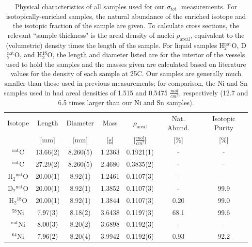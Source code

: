 \documentclass[twocolumn,secnumarabic,amssymb, nobibnotes, aps, prl,
superscriptaddress, nobalancelastpage]{revtex4}
\newcommand{\tots}{\ensuremath{\sigma_{tot}}\,\,}
\begin{document}
\begin{table}[ht]
    \caption{
        Physical characteristics of all samples used for our \tots
        measurements. For isotopically-enriched samples, the natural abundance
        of the enriched isotope and the isotopic fraction of the sample are
        given. To calculate cross sections, the relevant ``sample thickness" is the areal
        density of nuclei $\rho_{\text{areal}}$, equivalent to
        the (volumetric) density times the length of the sample. For liquid
        samples H$_{2}^{\text{nat}}$O, D$_{2}^{\text{nat}}$O, and H$_{2}^{18}$O,
        the length and diameter listed are for the interior of the vessels
        used to hold the samples and the masses given are calculated based on 
        literature values for the density of each sample at 25\textdegree{}C.
        Our samples are generally much smaller than those used in previous
        measurements; for comparison, the Ni and Sn samples used in \cite{Abfalterer2001,
        Finlay1993} had areal densities of 1.515 and 0.5475
        $\frac{mol}{cm^{2}}$, respectively (12.7 and 6.5 times larger than our
    Ni and Sn samples).}
    \label{SampleTable}
    \begin{center}
        \begin{tabular}{ c c c c c c c }
            \hline
            Isotope & Length & Diameter
            & Mass & $\rho_{\text{areal}}$ & Nat. Abund. & Isotopic Purity\\
                 & [mm] & [mm] & [g] & [$\frac{mol}{cm^{2}}$] & [\%] & [\%]\\
            \hline

            $^{\text{nat}}$C & 13.66(2) & 8.260(5) & 1.2363
            & 0.1921(1) & - & -\\
            $^{\text{nat}}$C & 27.29(2) & 8.260(5) & 2.4680
            & 0.3835(2) & - & -\\

            H$_{2}$$^{\text{nat}}$O & 20.00(1) & 8.92(1) & 1.2461 & 0.1107(3) & - &
            - \\
            D$_{2}$$^{\text{nat}}$O & 20.00(1) & 8.92(1) & 1.3852 & 0.1107(3) & - &
            99.9 \\
            H$_{2}$$^{18}$O & 20.00(1) & 8.92(1) & 1.3844 & 0.1107(3) & 0.20 &
            99.0\\

            $^{58}$Ni & 7.97(3)& 8.18(2) &
            3.6438 & 0.1197(3)& 68.1 & 99.6 \\
            $^{\text{nat}}$Ni & 8.00(3) & 8.20(2) &
            3.6898 & 0.1192(3)& - & -\\
            $^{64}$Ni & 7.96(2) & 8.20(4) &
            3.9942 & 0.1192(6) & 0.93 & 92.2\\


\end{tabular}
\end{center}
\end{table}
\end{document}
